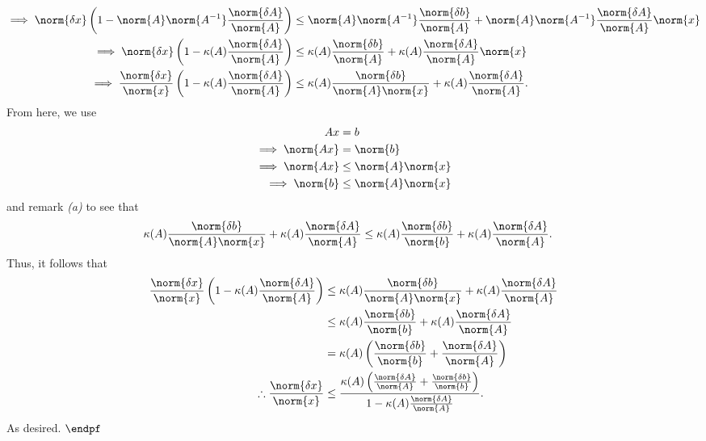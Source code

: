 \documentclass{report}
\begin{document}
\begin{itemize}
\begin{align*}
            \implies \norm{\delta x}\left(1-\norm{A}\norm{A^{-1}}\frac{\norm{\delta A}}{\norm{A}}\right) &\leq \norm{A}\norm{A^{-1}}\frac{\norm{\delta b}}{\norm{A}} + \norm{A}\norm{A^{-1}}\frac{\norm{\delta A}}{\norm{A}}\norm{x} \\
            \implies \norm{\delta x}\left(1-\kappa(A)\frac{\norm{\delta A}}{\norm{A}}\right) &\leq \kappa(A)\frac{\norm{\delta b}}{\norm{A}} + \kappa(A)\frac{\norm{\delta A}}{\norm{A}}\norm{x} \\ 
            \implies \frac{\norm{\delta x}}{\norm{x}}\left(1-\kappa(A)\frac{\norm{\delta A}}{\norm{A}}\right) &\leq \kappa(A)\frac{\norm{\delta b}}{\norm{A}\norm{x}} + \kappa(A)\frac{\norm{\delta A}}{\norm{A}}
        .\end{align*} 
        From here, we use 
        \begin{align*}
            Ax &= b \\
            \implies \norm{Ax} &= \norm{b} \\
            \implies \norm{Ax} &\leq \norm{A}\norm{x} \\
            \implies \norm{b} &\leq \norm{A}\norm{x}
        \end{align*}
        and remark \textit{(a)} to see that
        \begin{align*}
            \kappa(A) \frac{\norm{\delta b}}{\norm{A}\norm{x}} + \kappa(A) \frac{\norm{\delta A}}{\norm{A}} & \leq \kappa(A) \frac{\norm{\delta b}}{\norm{b}} + \kappa(A) \frac{\norm{\delta A}}{\norm{A}} 
        .\end{align*}
        Thus, it follows that
        \begin{align*}
            \frac{\norm{\delta x}}{\norm{x}}\left(1-\kappa(A)\frac{\norm{\delta A}}{\norm{A}}\right) &\leq \kappa(A)\frac{\norm{\delta b}}{\norm{A}\norm{x}} + \kappa(A)\frac{\norm{\delta A}}{\norm{A}} \\
                                                                                                              &\leq \kappa(A) \frac{\norm{\delta b}}{\norm{b}} + \kappa(A) \frac{\norm{\delta A}}{\norm{A}}  \\
                                                                                                              &= \kappa(A)\left(\frac{\norm{\delta b}}{\norm{b}}  + \frac{\norm{\delta A}}{\norm{A}}\right) \\
            \therefore \frac{\norm{\delta x}}{\norm{x}} &\leq \frac{\kappa(A)\left(\frac{\norm{\delta A}}{\norm{A}} + \frac{\norm{\delta b}}{\norm{b}}\right)}{1-\kappa(A)\frac{\norm{\delta A}}{\norm{A}}}
        .\end{align*}
        As desired. $\endpf$



    \end{itemize}
\end{document}
